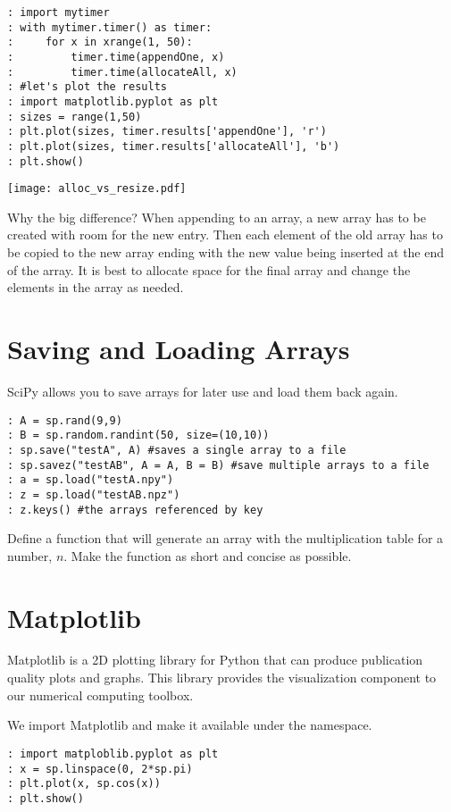 \begin{lstlisting}[style=python]
: import mytimer
: with mytimer.timer() as timer:
:     for x in xrange(1, 50):
:         timer.time(appendOne, x)
:         timer.time(allocateAll, x)
: #let's plot the results
: import matplotlib.pyplot as plt
: sizes = range(1,50)
: plt.plot(sizes, timer.results['appendOne'], 'r')
: plt.plot(sizes, timer.results['allocateAll'], 'b')
: plt.show()
\end{lstlisting}

\begin{center}
\texttt{[image: alloc\_vs\_resize.pdf]}
\end{center}

Why the big difference?  When appending to an array, a new array has to be created with room for the new entry.  Then each element of the old array has to be copied to the new array ending with the new value being inserted at the end of the array.  It is best to allocate space for the final array and change the elements in the array as needed.

\section*{Saving and Loading Arrays}
SciPy allows you to save arrays for later use and load them back again.
\begin{lstlisting}[style=python]
: A = sp.rand(9,9)
: B = sp.random.randint(50, size=(10,10))
: sp.save("testA", A) #saves a single array to a file
: sp.savez("testAB", A = A, B = B) #save multiple arrays to a file
: a = sp.load("testA.npy")
: z = sp.load("testAB.npz")
: z.keys() #the arrays referenced by key
\end{lstlisting}

\begin{problem}
Define a function that will generate an array with the multiplication table for a number, $n$.  Make the function as short and concise as possible.
\end{problem}

\section*{Matplotlib}
Matplotlib is a 2D plotting library for Python that can produce publication quality plots and graphs.  This library provides the visualization component to our numerical computing toolbox.

We import Matplotlib and make it available under the  namespace.
\begin{lstlisting}[style=python]
: import matploblib.pyplot as plt
: x = sp.linspace(0, 2*sp.pi)
: plt.plot(x, sp.cos(x))
: plt.show()
\end{lstlisting}


